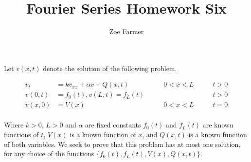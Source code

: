 \documentclass[10pt]{article}
\title{Fourier Series Homework Six}
\author{Zoe Farmer}
\begin{document}
\maketitle

\section{}

Let $v(x, t)$ denote the solution of the following problem.

\begin{align*}
    v_t &= k v_{xx} + \alpha v + Q(x, t) \qquad & 0 < x < L \qquad & t > 0\\
    v(0, t) &= f_0(t), v(L, t) = f_L(t) \qquad && t > 0\\
    v(x, 0) &= V(x) \qquad & 0 < x < L \qquad & t = 0\\
\end{align*}

Where $k > 0$, $L > 0$ and $\alpha$ are fixed constants $f_0(t)$ and $f_L(t)$ are known functions of $t$, $V(x)$ is a
known function of $x$, and $Q(x, t)$ is a known function of both variables. We seek to prove that this problem has at
most one solution, for any choice of the functions $\{ f_0(t), f_L(t), V(x), Q(x, t) \}$.\\
\end{document}
